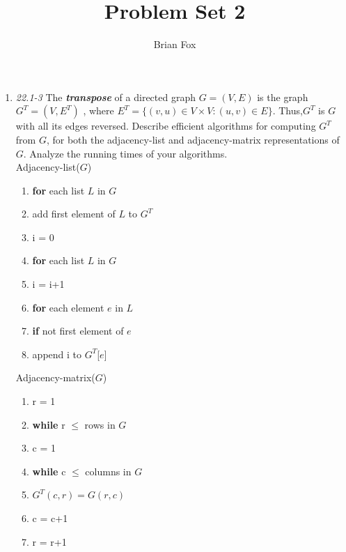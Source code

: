 \documentclass[]{memoir}
\title{Problem Set 2}
\author{Brian Fox}
\date{}
\begin{document}
\maketitle
\begin{enumerate}
\item \textit{22.1-3} The \textbf{\textit{transpose}} of a directed graph $G=(V,E)$ is the graph $G^{T}=(V,E^{T})$ , where $E^{T}=\{(v,u)\in{}V\times{}V:(u,v)\in{}E\}$. Thus,$G^{T}$ is $G$ with all its edges reversed. Describe efficient algorithms for computing $G^{T}$ from $G$, for both the adjacency-list and adjacency-matrix representations of $G$. Analyze the running times of your algorithms.\vspace{3mm}
\\ 
Adjacency-list($G$)
\begin{enumerate}[label=\arabic*\hspace{2mm}]
\item \textbf{for} each list $L$ in $G$
\item \hspace{1cm} add first element of $L$ to $G^{T}$
\item i = 0
\item \textbf{for} each list $L$ in $G$
\item \hspace{1cm} i = i+1
\item \hspace{1cm} \textbf{for} each element $e$ in $L$
\item \hspace{2cm} \textbf{if} not first element of $e$
\item \hspace{3cm}  append i to $G^{T}$[$e$]
\end{enumerate}
Adjacency-matrix($G$)
\begin{enumerate}[label=\arabic*\hspace{2mm}]
\item r = 1
\item \textbf{while} r $\leq$ rows in $G$
\item \hspace{1cm} c = 1
\item \hspace{1cm} \textbf{while} c $\leq$ columns in $G$
\item \hspace{2cm} $G^{T}(c,r)=G(r,c)$
\item \hspace{2cm} c = c+1
\item \hspace{1cm} r = r+1
\end{enumerate}

\end{enumerate}
\end{document}
